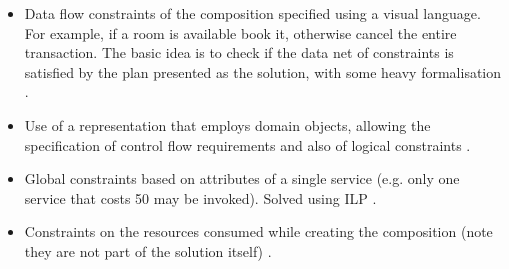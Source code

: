 \begin{itemize}
 \item Data flow constraints of the composition specified using a visual language. For example, if a room is available book it, otherwise cancel the entire transaction. The basic idea is to check if the data net of constraints is satisfied by the plan presented as the solution, with some heavy formalisation \cite{marconi2006specifying}.
 \item Use of a representation that employs domain objects, allowing the specification of control flow requirements and also of logical constraints \cite{bertoli2009control}.
 \item Global constraints based on attributes of a single service (e.g. only one service that costs 50 may be invoked). Solved using ILP \cite{yoo2008web}.
 \item Constraints on the resources consumed while creating the composition (note they are not part of the solution itself) \cite{xiang2011qos}.
\end{itemize}